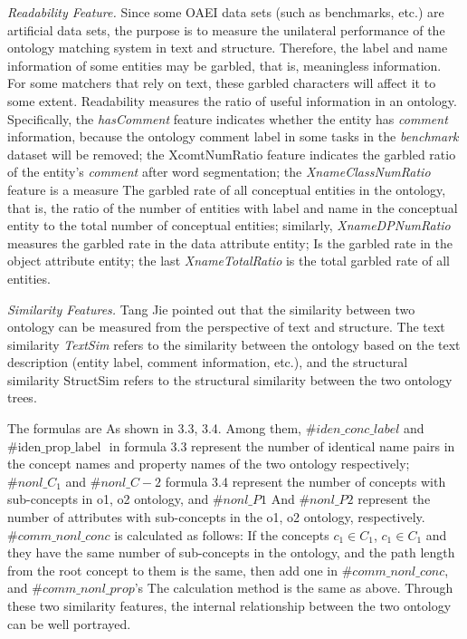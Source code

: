 \documentclass[twoside]{article}
\begin{document}
\begin{multicols}{2}
{\it Readability Feature.} Since some OAEI data sets (such as benchmarks, etc.) are artificial data sets, the purpose is to measure the unilateral performance of the ontology matching system in text and structure. 
Therefore, the label and name information of some entities may be garbled, that is, meaningless information. 
For some matchers that rely on text, these garbled characters will affect it to some extent. 
Readability measures the ratio of useful information in an ontology. 
Specifically, the {\it hasComment} feature indicates whether the entity has {\it comment} information, because the ontology comment label in some tasks in the {\it benchmark} dataset will be removed; the XcomtNumRatio feature indicates the garbled ratio of the entity's {\it comment} after word segmentation; the {\it XnameClassNumRatio} feature is a measure The garbled rate of all conceptual entities in the ontology, that is, the ratio of the number of entities with label and name in the conceptual entity to the total number of conceptual entities; similarly, {\it XnameDPNumRatio} measures the garbled rate in the data attribute entity; Is the garbled rate in the object attribute entity; the last {\it XnameTotalRatio} is the total garbled rate of all entities.

{\it Similarity Features.} Tang Jie\cite{tyz74} pointed out that the similarity between two ontology can be measured from the perspective of text and structure. The text similarity {\it TextSim} refers to the similarity between the ontology based on the text description (entity label, comment information, etc.), and the structural similarity StructSim refers to the structural similarity between the two ontology trees. 

The formulas are As shown in 3.3, 3.4. 
Among them, ${\#iden\_conc\_label}$ and $\text{\#iden\_prop\_label }$ in formula 3.3 represent the number of identical name pairs in the concept names and property names of the two ontology respectively; 
$\# nonl\_C_{1}$ and $\# nonl\_C-{2}$ formula 3.4 represent the number of concepts with sub-concepts in o1, o2 ontology, 
and $\# nonl\_P1$ And $\# nonl\_P2$ represent the number of attributes with sub-concepts in the o1, o2 ontology, respectively. 
$\#comm\_nonl\_conc$ is calculated as follows: 
If the concepts $c_{1} \in C_{1}$, $c_{1} \in C_{1}$ and they have the same number of sub-concepts in the ontology, and the path length from the root concept to them is the same, 
then add one in $\#comm\_nonl\_conc$, and $\#comm\_nonl\_prop$'s The calculation method is the same as above. 
Through these two similarity features, the internal relationship between the two ontology can be well portrayed.


\end{multicols}
\end{document}
